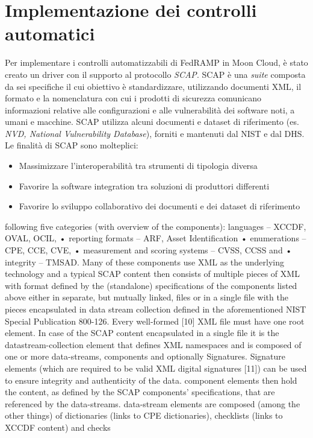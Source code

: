 \documentclass[../main.tex]{subfiles}
\begin{document}
\section{Implementazione dei controlli automatici}
Per implementare i controlli automatizzabili di FedRAMP in Moon Cloud, è stato creato un driver con il supporto al protocollo \textit{SCAP}.
SCAP è una \textit{suite} composta da sei specifiche il cui obiettivo è standardizzare, utilizzando documenti XML, il formato e la nomenclatura con cui i prodotti di sicurezza comunicano informazioni relative alle configurazioni e alle vulnerabilità dei software noti, a umani e macchine.
SCAP utilizza alcuni documenti e dataset di riferimento (es. \textit{NVD, National Vulnerability Database}), forniti e mantenuti dal NIST e dal DHS.
Le finalità di SCAP sono molteplici:
\begin{itemize}
    \item Massimizzare l'interoperabilità tra strumenti di tipologia diversa
    \item Favorire la software integration tra soluzioni di produttori differenti
    \item Favorire lo sviluppo collaborativo dei documenti e dei dataset di riferimento
\end{itemize}
following five categories (with overview of the components):
languages – XCCDF, OVAL, OCIL,
• reporting formats – ARF, Asset Identification
• enumerations – CPE, CCE, CVE,
• measurement and scoring systems – CVSS, CCSS and
• integrity – TMSAD.
Many of these components use XML as the underlying technology
and a typical SCAP content then consists of multiple pieces of XML
with format defined by the (standalone) specifications of the components
listed above either in separate, but mutually linked, files or in
a single file with the pieces encapsulated in data stream collection
defined in the aforementioned NIST Special Publication 800-126.
Every well-formed [10] XML file must have one root element. In
case of the SCAP content encapsulated in a single file it is the datastream-collection
element that defines XML namespaces and
is composed of one or more data-streams, components and optionally
Signatures. Signature elements (which are required to
be valid XML digital signatures [11]) can be used to ensure integrity
and authenticity of the data. component elements then hold the content,
as defined by the SCAP components’ specifications, that are referenced
by the data-streams. data-stream elements are composed
(among the other things) of dictionaries (links to CPE
dictionaries), checklists (links to XCCDF content) and checks
\end{document}
